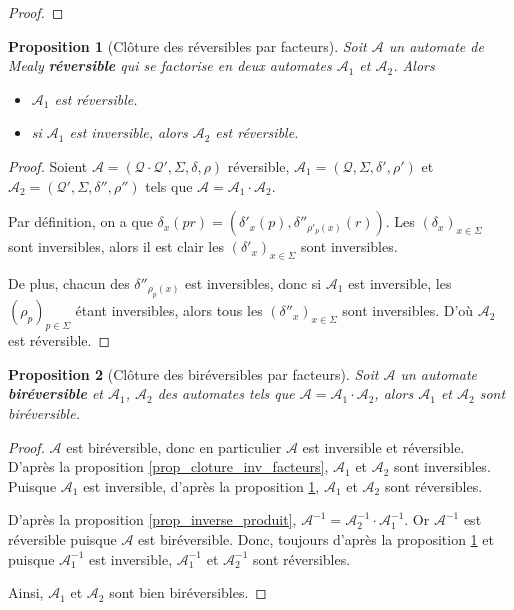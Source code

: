 \documentclass{article}
\newtheorem{prop}{Proposition}
\begin{document}
\begin{proof}

\end{proof}

\begin{prop}[Clôture des réversibles par facteurs]\label{prop_cloture_rev_facteurs}
  Soit $\mathcal{A}$ un automate de Mealy \textbf{réversible} qui se factorise en deux automates $\mathcal{A}_1$ et $\mathcal{A}_2$. Alors
  \begin{itemize}
  \item $\mathcal{A}_1$ est réversible.
  \item si $\mathcal{A}_1$ est inversible, alors $\mathcal{A}_2$ est réversible.
  \end{itemize}
\end{prop}

\begin{proof}
  Soient $\mathcal{A}=\left(\mathcal{Q\cdot Q'}, \Sigma, \delta, \rho\right)$ réversible, $\mathcal{A}_1=\left(\mathcal{Q}, \Sigma, \delta', \rho'\right)$ et $\mathcal{A}_2=\left(\mathcal{Q'}, \Sigma, \delta'', \rho''\right)$ tels que $\mathcal{A} = \mathcal{A}_1\cdot\mathcal{A}_2$.

  Par définition, on a que $\delta_x(pr) = (\delta'_x(p), \delta''_{\rho'_p(x)}(r))$. Les ${(\delta_x)}_{x\in\Sigma}$ sont inversibles, alors il est clair les ${(\delta'_x)}_{x\in\Sigma}$ sont inversibles.

  De plus, chacun des $\delta''_{\rho_p(x)}$ est inversibles, donc si $\mathcal{A}_1$ est inversible, les ${(\rho_p)}_{p\in\Sigma}$ étant inversibles, alors tous les ${(\delta''_x)}_{x\in\Sigma}$ sont inversibles. D'où $\mathcal{A}_2$ est réversible.
\end{proof}

\begin{prop}[Clôture des biréversibles par facteurs]
  Soit $\mathcal{A}$ un automate \textbf{biréversible} et $\mathcal{A}_1$, $\mathcal{A}_2$ des automates tels que $\mathcal{A}=\mathcal{A}_1\cdot\mathcal{A}_2$, alors $\mathcal{A}_1$ et $\mathcal{A}_2$ sont biréversible.
\end{prop}

\begin{proof}
    $\mathcal{A}$ est biréversible, donc en particulier $\mathcal{A}$ est inversible et réversible. D'après la proposition \ref{prop_cloture_inv_facteurs}, $\mathcal{A}_1$ et $\mathcal{A}_2$ sont inversibles. Puisque $\mathcal{A}_1$ est inversible, d'après la proposition \ref{prop_cloture_rev_facteurs}, $\mathcal{A}_1$ et $\mathcal{A}_2$ sont réversibles.

    D'après la proposition \ref{prop_inverse_produit}, $\mathcal{A}^{-1} = \mathcal{A}_2^{-1} \cdot \mathcal{A}_1^{-1}$. Or $\mathcal{A}^{-1}$ est réversible puisque $\mathcal{A}$ est biréversible. Donc, toujours d'après la proposition \ref{prop_cloture_rev_facteurs} et puisque $\mathcal{A}_1^{-1}$ est inversible, $\mathcal{A}_1^{-1}$ et $\mathcal{A}_2^{-1}$ sont réversibles.

    Ainsi, $\mathcal{A}_1$ et $\mathcal{A}_2$ sont bien biréversibles.
\end{proof}
\end{document}
